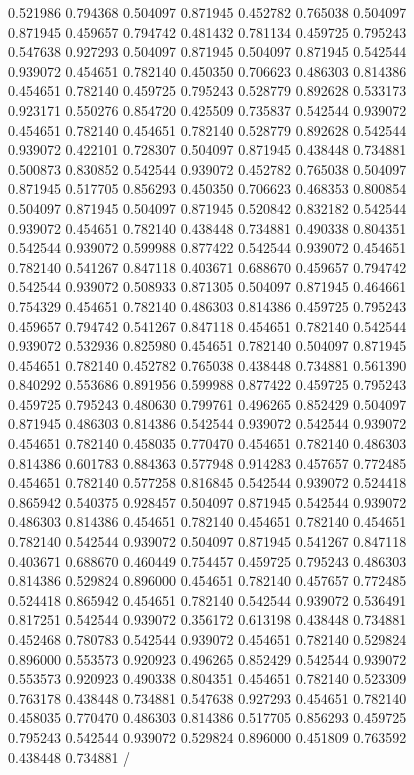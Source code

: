 \begin{figure}
\begin{center}
{  0.521986 0.794368
  0.504097 0.871945
  0.452782 0.765038
  0.504097 0.871945
  0.459657 0.794742
  0.481432 0.781134
  0.459725 0.795243
  0.547638 0.927293
  0.504097 0.871945
  0.504097 0.871945
  0.542544 0.939072
  0.454651 0.782140
  0.450350 0.706623
  0.486303 0.814386
  0.454651 0.782140
  0.459725 0.795243
  0.528779 0.892628
  0.533173 0.923171
  0.550276 0.854720
  0.425509 0.735837
  0.542544 0.939072
  0.454651 0.782140
  0.454651 0.782140
  0.528779 0.892628
  0.542544 0.939072
  0.422101 0.728307
  0.504097 0.871945
  0.438448 0.734881
  0.500873 0.830852
  0.542544 0.939072
  0.452782 0.765038
  0.504097 0.871945
  0.517705 0.856293
  0.450350 0.706623
  0.468353 0.800854
  0.504097 0.871945
  0.504097 0.871945
  0.520842 0.832182
  0.542544 0.939072
  0.454651 0.782140
  0.438448 0.734881
  0.490338 0.804351
  0.542544 0.939072
  0.599988 0.877422
  0.542544 0.939072
  0.454651 0.782140
  0.541267 0.847118
  0.403671 0.688670
  0.459657 0.794742
  0.542544 0.939072
  0.508933 0.871305
  0.504097 0.871945
  0.464661 0.754329
  0.454651 0.782140
  0.486303 0.814386
  0.459725 0.795243
  0.459657 0.794742
  0.541267 0.847118
  0.454651 0.782140
  0.542544 0.939072
  0.532936 0.825980
  0.454651 0.782140
  0.504097 0.871945
  0.454651 0.782140
  0.452782 0.765038
  0.438448 0.734881
  0.561390 0.840292
  0.553686 0.891956
  0.599988 0.877422
  0.459725 0.795243
  0.459725 0.795243
  0.480630 0.799761
  0.496265 0.852429
  0.504097 0.871945
  0.486303 0.814386
  0.542544 0.939072
  0.542544 0.939072
  0.454651 0.782140
  0.458035 0.770470
  0.454651 0.782140
  0.486303 0.814386
  0.601783 0.884363
  0.577948 0.914283
  0.457657 0.772485
  0.454651 0.782140
  0.577258 0.816845
  0.542544 0.939072
  0.524418 0.865942
  0.540375 0.928457
  0.504097 0.871945
  0.542544 0.939072
  0.486303 0.814386
  0.454651 0.782140
  0.454651 0.782140
  0.454651 0.782140
  0.542544 0.939072
  0.504097 0.871945
  0.541267 0.847118
  0.403671 0.688670
  0.460449 0.754457
  0.459725 0.795243
  0.486303 0.814386
  0.529824 0.896000
  0.454651 0.782140
  0.457657 0.772485
  0.524418 0.865942
  0.454651 0.782140
  0.542544 0.939072
  0.536491 0.817251
  0.542544 0.939072
  0.356172 0.613198
  0.438448 0.734881
  0.452468 0.780783
  0.542544 0.939072
  0.454651 0.782140
  0.529824 0.896000
  0.553573 0.920923
  0.496265 0.852429
  0.542544 0.939072
  0.553573 0.920923
  0.490338 0.804351
  0.454651 0.782140
  0.523309 0.763178
  0.438448 0.734881
  0.547638 0.927293
  0.454651 0.782140
  0.458035 0.770470
  0.486303 0.814386
  0.517705 0.856293
  0.459725 0.795243
  0.542544 0.939072
  0.529824 0.896000
  0.451809 0.763592
  0.438448 0.734881
/
\endpicture%
}
\end{center}
\end{figure}
